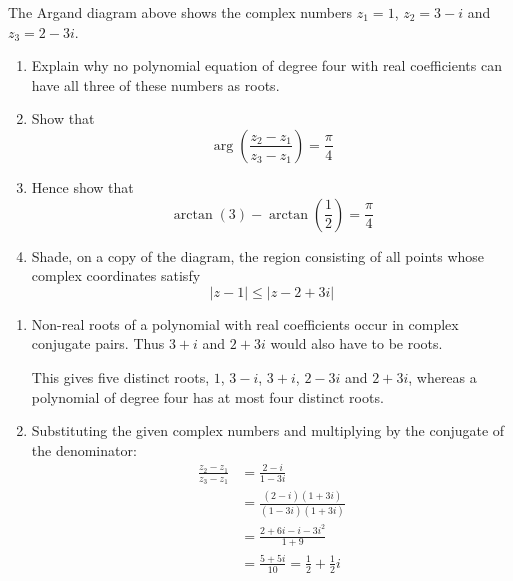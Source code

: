 \documentclass[leqno]{article}
\begin{document}
\begin{enumerate}[
  label=\textbf{\arabic*.},
  leftmargin=*,
  topsep=0pt,
  partopsep=0pt,
  parsep=0pt
]
\begin{figure}[H]
    \centering
{}
\end{figure}


The Argand diagram above shows the complex numbers $z_1=1$, $z_2=3-i$ and $z_3=2-3i$. \\
\begin{enumerate}[label=\textbf{(\alph*)}]
\item Explain why no polynomial equation of degree four with real coefficients can have all three of these numbers as roots.  \\
\item Show that
\[
\arg\left(\frac{z_2-z_1}{z_3-z_1}\right)=\frac{\pi}{4}
\] 
\item Hence show that
\[
\arctan(3)-\arctan\left(\frac{1}{2}\right)=\frac{\pi}{4}
\] 
\item Shade, on a copy of the diagram, the region consisting of all points whose complex coordinates satisfy
\[
|z-1|\leq |z-2+3i|
\] 
\end{enumerate}

\vspace*{10pt}

\begin{djsSolution}
\begin{enumerate}[label=\textbf{(\alph*)}, start=1]
\item Non-real roots of a polynomial with real coefficients occur in complex conjugate pairs. Thus \(3+i\) and \(2+3i\) would also have to be roots.

This gives five distinct roots, \(1\), \(3-i\), \(3+i\), \(2-3i\) and \(2+3i\), whereas a polynomial of degree four has at most four distinct roots.

\item Substituting the given complex numbers and multiplying by the conjugate of the denominator:
\begin{align*}
\frac{z_2-z_1}{z_3-z_1}
&=\frac{2-i}{1-3i}\\
&=\frac{(2-i)(1+3i)}{(1-3i)(1+3i)}\\
&=\frac{2+6i-i-3i^2}{1+9}\\
&=\frac{5+5i}{10}=\frac12+\frac12i
\end{align*}


\end{enumerate}
\end{djsSolution}
\end{enumerate}
\end{document}
